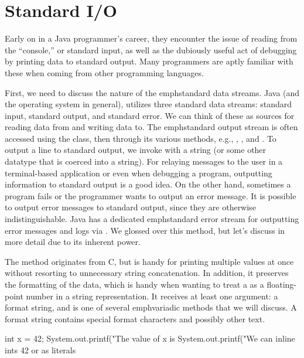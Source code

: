 \section{Standard I/O}
Early on in a Java programmer's career, they encounter the issue of reading from the ``console,'' or standard input, as well as the dubiously useful act of debugging by printing data to standard output. Many programmers are aptly familiar with these when coming from other programming languages.

First, we need to discuss the nature of the emph{standard data streams}. Java (and the operating system in general), utilizes three standard data streams: standard input, standard output, and standard error. We can think of these as sources for reading data from and writing data to. The emph{standard output stream} is often accessed using the  class, then through its various methods, e.g., , , and . To output a line to standard output, we invoke  with a string (or some other datatype that is coerced into a string). For relaying messages to the user in a terminal-based application or even when debugging a program, outputting information to standard output is a good idea. On the other hand, sometimes a program fails or the programmer wants to output an error message. It is possible to output error messages to standard output, since they are otherwise indistinguishable. Java has a dedicated emph{standard error stream} for outputting error messages and logs via . We glossed over this method, but let's discuss  in more detail due to its inherent power.

The  method originates from C, but is handy for printing multiple values at once without resorting to unnecessary string concatenation. In addition, it preserves the formatting of the data, which is handy when wanting to treat a  as a floating-point number in a string representation. It receives at least one argument: a format string, and is one of several emph{variadic methods} that we will discuss. A format string contains special format characters and possibly other text. 

\begin{verbnobox}[\small]
int x = 42;
System.out.printf("The value of x is %
System.out.printf("We can inline ints 42 or as literals %
\end{verbnobox}

